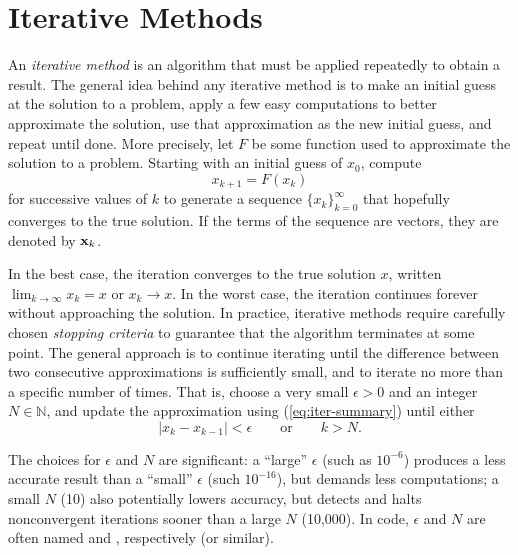 \label{lab:NewtonsMethod}

\section*{Iterative Methods} %

An \emph{iterative method} is an algorithm that must be applied repeatedly to obtain a result.
The general idea behind any iterative method is to make an initial guess at the solution to a problem, apply a few easy computations to better approximate the solution, use that approximation as the new initial guess, and repeat until done.
More precisely, let $F$ be some function used to approximate the solution to a problem.
Starting with an initial guess of $x_0$, compute
\begin{equation}x_{k+1} = F(x_k)\label{eq:iter-summary}\end{equation}
for successive values of $k$ to generate a sequence $\{x_k\}_{k=0}^\infty$ that hopefully converges to the true solution.
If the terms of the sequence are vectors, they are denoted by $\mathbf{x}_k$.

In the best case, the iteration converges to the true solution $x$, written $\lim_{k\rightarrow\infty} x_k = x$ or $x_k\rightarrow x$.
In the worst case, the iteration continues forever without approaching the solution.
In practice, iterative methods require carefully chosen \emph{stopping criteria} to guarantee that the algorithm terminates at some point.
The general approach is to continue iterating until the difference between two consecutive approximations is sufficiently small, and to iterate no more than a specific number of times.
That is, choose a very small $\epsilon > 0$ and an integer $N\in\mathbb{N}$, and update the approximation using (\ref{eq:iter-summary}) until either
\begin{equation} %
|x_k - x_{k-1}| < \epsilon
\qquad \text{or} \qquad
k > N.
\label{stopping-criteria}
\end{equation}

The choices for $\epsilon$ and $N$ are significant: a ``large'' $\epsilon$ (such as $10^{-6}$) produces a less accurate result than a ``small'' $\epsilon$ (such $10^{-16}$), but demands less computations; a small $N$ (10) also potentially lowers accuracy, but detects and halts nonconvergent iterations sooner than a large $N$ (10,000).
In code, $\epsilon$ and $N$ are often named  and , respectively (or similar).

